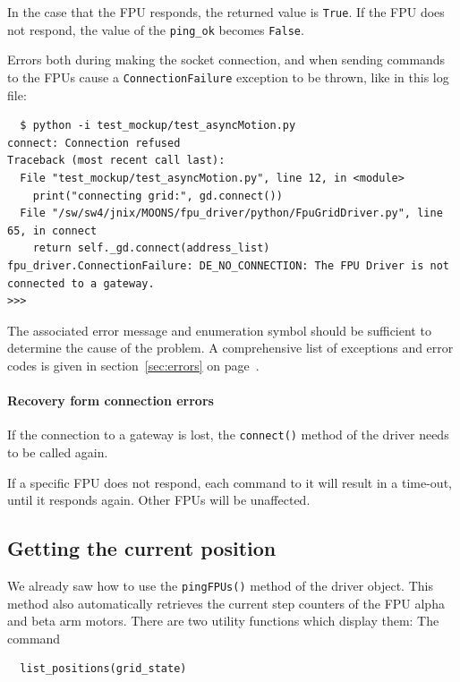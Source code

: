 \documentclass[11pt,a4paper]{report}
\begin{document}
In the case that the FPU responds, the returned value is
\texttt{True}.  If the FPU does not respond, the value of the
\verb+ping_ok+ becomes \texttt{False}.

Errors both during making the socket connection, and when sending
commands to the FPUs cause a \texttt{ConnectionFailure} exception to
be thrown, like in this log file:

\begin{verbatim}
  $ python -i test_mockup/test_asyncMotion.py 
connect: Connection refused
Traceback (most recent call last):
  File "test_mockup/test_asyncMotion.py", line 12, in <module>
    print("connecting grid:", gd.connect())
  File "/sw/sw4/jnix/MOONS/fpu_driver/python/FpuGridDriver.py", line 65, in connect
    return self._gd.connect(address_list)
fpu_driver.ConnectionFailure: DE_NO_CONNECTION: The FPU Driver is not connected to a gateway.
>>> 
\end{verbatim}


The associated error message and enumeration symbol should be
sufficient to determine the cause of the problem. A comprehensive list
of exceptions and error codes is given in section~\ref{sec:errors} on
page~\pageref{sec:errors}.

\paragraph{Recovery form connection errors}
If the connection to a gateway is lost, the \texttt{connect()} method
of the driver needs to be called again.

If a specific FPU does not respond, each command to it will result in
a time-out, until it responds again. Other FPUs will be unaffected.



\subsection{Getting the current position}
   We already saw how to use
the \texttt{pingFPUs()} method of the driver object. This method also
automatically retrieves the current step counters of the FPU alpha and
beta arm motors.  There are two utility functions which display them:
The command

\begin{verbatim}
  list_positions(grid_state)
\end{verbatim}
\end{document}
